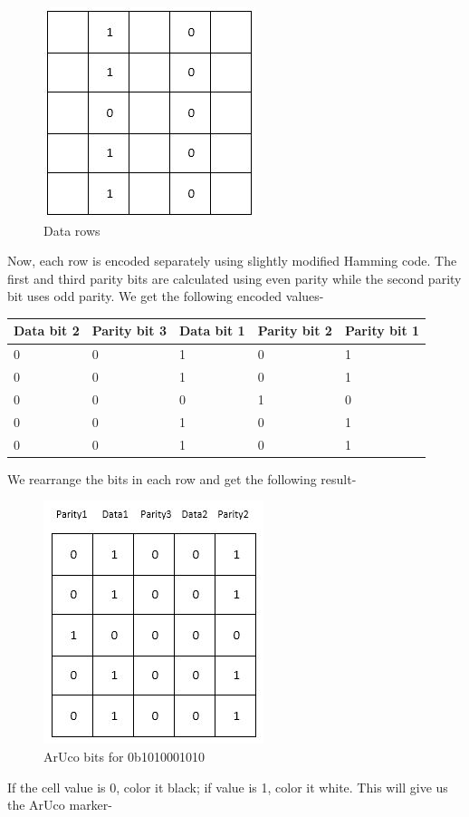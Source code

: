 \documentclass[]{article}
\begin{document}
\begin{figure}[htbp]
\centering
\includegraphics{images/Aruco markers/1.JPG}
\caption{Data rows}
\end{figure}

Now, each row is encoded separately using slightly modified Hamming
code. The first and third parity bits are calculated using even parity
while the second parity bit uses odd parity. We get the following
encoded values-

\begin{longtable}[c]{@{}lllll@{}}
\toprule
Data bit 2 & Parity bit 3 & Data bit 1 & Parity bit 2 & Parity bit
1\tabularnewline
\midrule
\endhead
0 & 0 & 1 & 0 & 1\tabularnewline
0 & 0 & 1 & 0 & 1\tabularnewline
0 & 0 & 0 & 1 & 0\tabularnewline
0 & 0 & 1 & 0 & 1\tabularnewline
0 & 0 & 1 & 0 & 1\tabularnewline
\bottomrule
\end{longtable}

We rearrange the bits in each row and get the following result-

\begin{figure}[htbp]
\centering
\includegraphics{images/Aruco markers/2.JPG}
\caption{ArUco bits for 0b1010001010}
\end{figure}

If the cell value is 0, color it black; if value is 1, color it white.
This will give us the ArUco marker-
\end{document}
